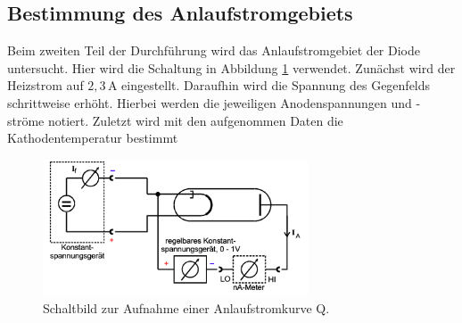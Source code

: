 \subsection{Bestimmung des Anlaufstromgebiets}
Beim zweiten Teil der Durchführung wird das Anlaufstromgebiet der Diode untersucht. Hier wird die 
Schaltung in Abbildung \ref{fig:zweiteApparatur} verwendet. Zunächst wird der Heizstrom auf $2,3\,\unit{\ampere}$
eingestellt. Daraufhin wird die Spannung des Gegenfelds schrittweise erhöht. Hierbei werden die jeweiligen Anodenspannungen
und -ströme notiert. Zuletzt wird mit den aufgenommen Daten die Kathodentemperatur bestimmt
\begin{figure}[H]
    \centering
    \includegraphics[width=0.7\textwidth]{content/Bilder/zweiterAufbau.png}
    \caption{Schaltbild zur Aufnahme einer Anlaufstromkurve Q\cite{anleitungV504}.}
    \label{fig:zweiteApparatur}
\end{figure}
